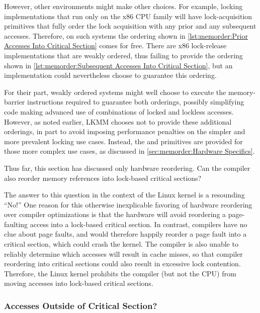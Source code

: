 However, other environments might make other choices.
For example, locking implementations that run only on the x86 CPU
family will have lock-acquisition primitives that fully order the lock
acquisition with any prior and any subsequent accesses.
Therefore, on such systems the ordering shown in
\cref{lst:memorder:Prior Accesses Into Critical Section}
comes for free.
There are x86 lock-release implementations that are weakly ordered,
thus failing to provide the ordering shown in
\cref{lst:memorder:Subsequent Accesses Into Critical Section},
but an implementation could nevertheless choose to guarantee this ordering.

For their part, weakly ordered systems might well choose to execute
the memory-barrier instructions required to guarantee both orderings,
possibly simplifying code making advanced use of combinations of locked
and lockless accesses.
However, as noted earlier, LKMM chooses not to provide these additional
orderings, in part to avoid imposing performance penalties on the simpler
and more prevalent locking use cases.
Instead, the  and 
primitives are provided for those more complex use cases, as discussed
in \cref{sec:memorder:Hardware Specifics}.

Thus far, this section has discussed only hardware reordering.
Can the compiler also reorder memory references into lock-based
critical sections?

The answer to this question in the context of the Linux kernel is a
resounding ``No!''
One reason for this otherwise inexplicable favoring of hardware reordering
over compiler optimizations is that the hardware will avoid reordering
a page-faulting access into a lock-based critical section.
In contrast, compilers have no clue about page faults, and would
therefore happily reorder a page fault into a critical section, which
could crash the kernel.
The compiler is also unable to reliably determine which accesses
will result in cache misses, so that compiler reordering into critical
sections could also result in excessive lock contention.
Therefore, the Linux kernel prohibits the compiler (but not the CPU)
from moving accesses into lock-based critical sections.

\subsubsection{Accesses Outside of Critical Section?}
\label{sec:memorder:Accesses Outside of Critical Section?}


